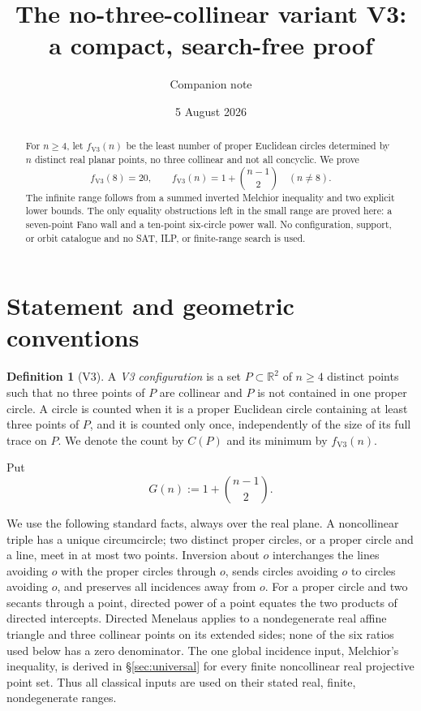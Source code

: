 \documentclass[11pt]{article}
\title{The no-three-collinear variant V3:\\[1mm]a compact, search-free proof}
\author{Companion note}
\date{5 August 2026}
\theoremstyle{definition}
\newtheorem{definition}[theorem]{Definition}
\theoremstyle{remark}
\newcommand{\R}{\mathbb R}
\begin{document}
\maketitle

\begin{abstract}
For \(n\geq4\), let \(f_{\mathrm{V3}}(n)\) be the least number of proper
Euclidean circles determined by \(n\) distinct real planar points, no three
collinear and not all concyclic.  We prove
\[
 f_{\mathrm{V3}}(8)=20,
 \qquad
 f_{\mathrm{V3}}(n)=1+\binom{n-1}{2}\quad(n\neq8).
\]
The infinite range follows from a summed inverted Melchior inequality and
two explicit lower bounds.  The only equality obstructions left in the
small range are proved here: a seven-point Fano wall and a ten-point
six-circle power wall.  No configuration, support, or orbit catalogue and
no SAT, ILP, or finite-range search is used.
\end{abstract}

\section{Statement and geometric conventions}

\begin{definition}[V3]
A \emph{V3 configuration} is a set \(P\subset\R^2\) of \(n\geq4\) distinct
points such that no three points of \(P\) are collinear and \(P\) is not
contained in one proper circle.  A circle is counted when it is a proper
Euclidean circle containing at least three points of \(P\), and it is
counted only once, independently of the size of its full trace on \(P\).
We denote the count by \(C(P)\) and its minimum by \(f_{\mathrm{V3}}(n)\).
\end{definition}

Put
\begin{equation}\label{eq:G}
 G(n):=1+\binom{n-1}{2}.
\end{equation}

We use the following standard facts, always over the real plane.  A
noncollinear triple has a unique circumcircle; two distinct proper circles,
or a proper circle and a line, meet in at most two points.  Inversion about
\(o\) interchanges the lines avoiding \(o\) with the proper circles through
\(o\), sends circles avoiding \(o\) to circles avoiding \(o\), and preserves
all incidences away from \(o\).  For a proper circle and two secants through
a point, directed power of a point equates the two products of directed
intercepts.  Directed Menelaus applies to a nondegenerate real affine
triangle and three collinear points on its extended sides; none of the six
ratios used below has a zero denominator.  The one global incidence input,
Melchior's inequality, is derived in \S\ref{sec:universal} for every finite
noncollinear real projective point set.  Thus all classical inputs are used
on their stated real, finite, nondegenerate ranges.
\end{document}
